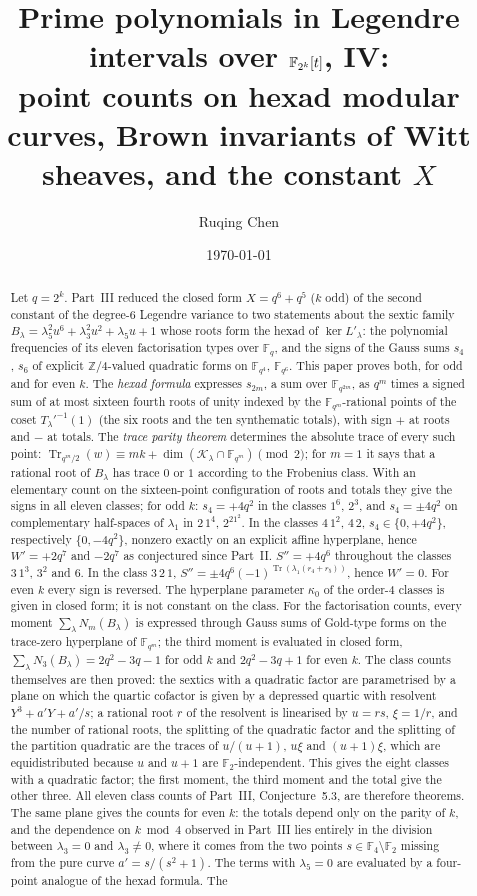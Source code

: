 \documentclass[12pt,a4paper]{amsart}
\title[Legendre intervals in even characteristic, IV]{Prime polynomials in Legendre intervals over \texorpdfstring{$\F_{2^k}[t]$}{F(2k)[t]}, IV:\texorpdfstring{\\}{ }point counts on hexad modular curves, Brown invariants of Witt sheaves, and the constant \texorpdfstring{$X$}{X}}
\author{Ruqing Chen}
\date{\today}
\theoremstyle{definition}
\newcommand{\F}{\mathbb{F}}
\newcommand{\Z}{\mathbb{Z}}
\newcommand{\Tr}{\operatorname{Tr}}
\newcommand{\Kk}{\mathcal{K}}
\newcommand{\Spp}{S''}
\begin{document}
\begin{abstract}
Let $q=2^k$. Part~III reduced the closed form $X=q^6+q^5$ ($k$ odd) of the second constant of the degree-$6$ Legendre variance to two statements about the sextic family $B_\lambda=\lambda_5^2u^6+\lambda_3^2u^2+\lambda_5u+1$ whose roots form the hexad of $\ker L'_\lambda$: the polynomial frequencies of its eleven factorisation types over $\F_q$, and the signs of the Gauss sums $s_4$, $s_6$ of explicit $\Z/4$-valued quadratic forms on $\F_{q^4}$, $\F_{q^6}$. This paper proves both, for odd and for even $k$. The \emph{hexad formula} expresses $s_{2m}$, a sum over $\F_{q^{2m}}$, as $q^m$ times a signed sum of at most sixteen fourth roots of unity indexed by the $\F_{q^m}$-rational points of the coset $T_\lambda'^{-1}(1)$ (the six roots and the ten synthematic totals), with sign $+$ at roots and $-$ at totals. The \emph{trace parity theorem} determines the absolute trace of every such point: $\Tr_{q^m/2}(w)\equiv mk+\dim(\Kk_\lambda\cap\F_{q^m})\pmod2$; for $m=1$ it says that a rational root of $B_\lambda$ has trace $0$ or $1$ according to the Frobenius class. With an elementary count on the sixteen-point configuration of roots and totals they give the signs in all eleven classes; for odd $k$: $s_4=+4q^2$ in the classes $1^6$, $2^3$, and $s_4=\pm4q^2$ on complementary half-spaces of $\lambda_1$ in $2\,1^4$, $2^21^2$. In the classes $4\,1^2$, $4\,2$, $s_4\in\{0,+4q^2\}$, respectively $\{0,-4q^2\}$, nonzero exactly on an explicit affine hyperplane, hence $W'=+2q^7$ and $-2q^7$ as conjectured since Part~II. $\Spp=+4q^6$ throughout the classes $3\,1^3$, $3^2$ and $6$. In the class $3\,2\,1$, $\Spp=\pm4q^6(-1)^{\Tr(\lambda_1(r_4+r_5))}$, hence $W'=0$. For even $k$ every sign is reversed. The hyperplane parameter $\kappa_0$ of the order-$4$ classes is given in closed form; it is not constant on the class. For the factorisation counts, every moment $\sum_\lambda N_m(B_\lambda)$ is expressed through Gauss sums of Gold-type forms on the trace-zero hyperplane of $\F_{q^m}$; the third moment is evaluated in closed form, $\sum_\lambda N_3(B_\lambda)=2q^2-3q-1$ for odd $k$ and $2q^2-3q+1$ for even $k$. The class counts themselves are then proved: the sextics with a quadratic factor are parametrised by a plane on which the quartic cofactor is given by a depressed quartic with resolvent $Y^3+a'Y+a'/s$; a rational root $r$ of the resolvent is linearised by $u=rs$, $\xi=1/r$, and the number of rational roots, the splitting of the quadratic factor and the splitting of the partition quadratic are the traces of $u/(u+1)$, $u\xi$ and $(u+1)\xi$, which are equidistributed because $u$ and $u+1$ are $\F_2$-independent. This gives the eight classes with a quadratic factor; the first moment, the third moment and the total give the other three. All eleven class counts of Part~III, Conjecture~5.3, are therefore theorems. The same plane gives the counts for even $k$: the totals depend only on the parity of $k$, and the dependence on $k\bmod4$ observed in Part~III lies entirely in the division between $\lambda_3=0$ and $\lambda_3\ne0$, where it comes from the two points $s\in\F_4\setminus\F_2$ missing from the pure curve $a'=s/(s^2+1)$. The terms with $\lambda_5=0$ are evaluated by a four-point analogue of the hexad formula. The 
\end{abstract}
\end{document}
